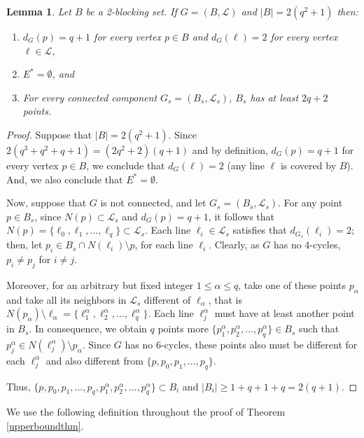 \documentclass[12pt]{article}
\newtheorem{lemma}[theorem]{Lemma}
\begin{document}
\begin{lemma}\label{Lem:CotaB}
    Let $B$ be a 2-blocking set. If $G=(B,\mathcal{L})$ and $|B|=2(q^2+1)$ then:
    \begin{enumerate}
    \item $d_G(p)=q+1$ for every vertex $p\in B$ and $d_G(\ell)=2$ for every vertex $\ell \in \mathcal{L}$,
        \item $E^*=\emptyset$, and 
    \item For every connected component $G_s=(B_s,\mathcal{L}_s)$, $B_s$ has at least $2q+2$ points.
    \end{enumerate}
\end{lemma}   
    
\begin{proof}
    Suppose that $|B|=2(q^2+1)$. Since $2(q^3+q^2+q+1)=(2q^2+2)(q+1)$ and by definition, $d_G(p)=q+1$ for every vertex $p\in B$, we conclude that $d_G(\ell)=2$ (any line $\ell$ is covered by $B$). And, we also conclude that $E^*=\emptyset$. 
        
    Now, suppose that $G$ is not connected, and let $G_s=(B_s,\mathcal{L}_s)$. 
    For any point $p\in B_s$, since $N(p)\subset \mathcal{L}_s$ and $d_G(p)=q+1$, it follows that $N(p)=\{\ell_0,\ell_1,\dots,\ell_q\}\subset \mathcal{L}_s$. Each line $\ell_i\in \mathcal{L}_s$ satisfies that $d_{{G}_s}(\ell_i)=2$; then, let $p_i\in B_s\cap N(\ell_i)\setminus p$, for each line $\ell_i$. Clearly, as $G$ has no 4-cycles, $p_i\neq p_j$ for $i\neq j$. 
    
    Moreover, for an arbitrary but fixed integer $1\le\alpha\le q$, take one of these points $p_{\alpha}$ and take all its neighbors in $\mathcal{L}_s$ different of $\ell_{\alpha}$, that is $N(p_{\alpha})\setminus{\ell_{\alpha}}=\{\ell^{\alpha}_1,\ell^{\alpha}_2,\dots,\ell^{\alpha}_q\}$. Each line $\ell^{\alpha}_j$ must have at least another point in $B_s$. 
    In consequence, we obtain $q$ points more $\{p^{\alpha}_1,p^{\alpha}_2,\dots,p^{\alpha}_q\}\in B_s$ such that $p^{\alpha}_j\in N(\ell^{\alpha}_j)\setminus p_{\alpha}$. Since $G$ has no $6$-cycles, these points also must be different for each $\ell^{\alpha}_j$ and also different from $\{p,p_0,p_1,\dots,p_q\}$.
     
     Thus, $\{p,p_0,p_1,\dots,p_q,p^{\alpha}_1,p^{\alpha}_2,\dots,p^{\alpha}_q\}\subset B_i$ and  $|B_i|\ge 1+q+1+q=2(q+1)$.
\end{proof}

We use the following definition throughout the proof of Theorem \ref{upperboundthm}. 
\end{document}
